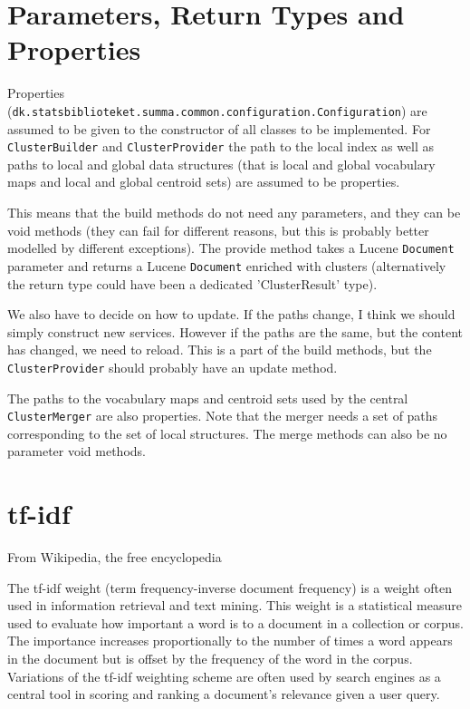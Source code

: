\documentclass[a4paper,12pt]{article}
\begin{document}
\section{Parameters, Return Types and Properties}
\label{parameters-returntypes-properties}

Properties
(\texttt{dk.statsbiblioteket.summa.common.configuration.Configuration})
are assumed to be given to the constructor of all classes to be
implemented. For \texttt{ClusterBuilder} and \texttt{ClusterProvider}
the path to the local index as well as paths to local and global data
structures (that is local and global vocabulary maps and local and
global centroid sets) are assumed to be properties.

This means that the build methods do not need any parameters, and they
can be void methods (they can fail for different reasons, but this is
probably better modelled by different exceptions). The provide method
takes a Lucene \texttt{Document} parameter and returns a Lucene
\texttt{Document} enriched with clusters (alternatively the return
type could have been a dedicated 'ClusterResult' type).

We also have to decide on how to update. If the paths change, I think
we should simply construct new services. However if the paths are the
same, but the content has changed, we need to reload. This is a part
of the build methods, but the \texttt{ClusterProvider} should probably
have an update method.

The paths to the vocabulary maps and centroid sets used by the central
\texttt{ClusterMerger} are also properties. Note that the merger needs
a set of paths corresponding to the set of local structures. The merge
methods can also be no parameter void methods.

\appendix

\section{tf-idf}
\label{tf-idf}
From Wikipedia, the free encyclopedia

The tf-idf weight (term frequency-inverse document frequency) is a
weight often used in information retrieval and text mining. This
weight is a statistical measure used to evaluate how important a word
is to a document in a collection or corpus. The importance increases
proportionally to the number of times a word appears in the document
but is offset by the frequency of the word in the corpus. Variations
of the tf-idf weighting scheme are often used by
search engines as a central tool in scoring and ranking a document's
relevance given a user query.
\end{document}
